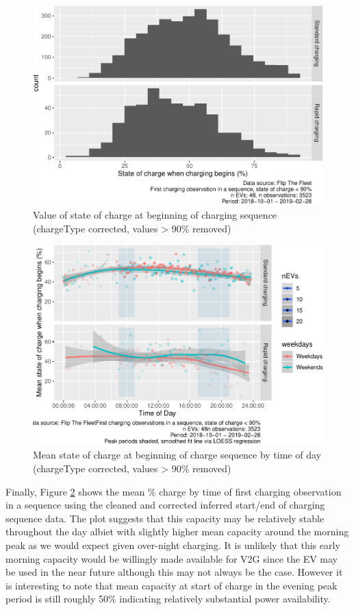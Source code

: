 \documentclass[]{article}
\begin{document}
\begin{figure}
\centering
\includegraphics{EVBB_report_v1_files/figure-latex/SoCplot3-1.pdf}
\caption{\label{fig:SoCplot3}Value of state of charge at beginning of charging sequence (chargeType corrected, values \textgreater{} 90\% removed)}
\end{figure}

\begin{figure}
\centering
\includegraphics{EVBB_report_v1_files/figure-latex/SoCplotTiming-1.pdf}
\caption{\label{fig:SoCplotTiming}Mean state of charge at beginning of charge sequence by time of day (chargeType corrected, values \textgreater{} 90\% removed)}
\end{figure}

Finally, Figure \ref{fig:SoCplotTiming} shows the mean \% charge by time of first charging observation in a sequence using the cleaned and corrected inferred start/end of charging sequence data. The plot suggests that this capacity may be relatively stable throughout the day albiet with slightly higher mean capacity around the morning peak as we would expect given over-night charging. It is unlikely that this early morning capacity would be willingly made available for V2G since the EV may be used in the near future although this may not always be the case. However it is interesting to note that mean capacity at start of charge in the evening peak period is still roughly 50\% indicating relatively substantial power availability.
\end{document}

